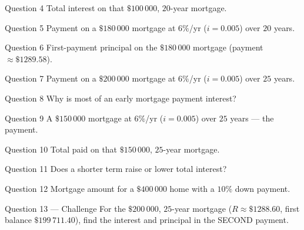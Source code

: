 \documentclass[11pt]{article}
\begin{document}
\begin{qbox}{Question 4}
Total interest on that $\$100\,000$, $20$-year mortgage.\workspace{2.4cm}
\end{qbox}

\begin{qbox}{Question 5}
Payment on a $\$180\,000$ mortgage at $6\%$/yr ($i=0.005$) over $20$ years.\workspace{2.4cm}
\end{qbox}

\begin{qbox}{Question 6}
First-payment principal on the $\$180\,000$ mortgage (payment $\approx\$1289.58$).\workspace{2.4cm}
\end{qbox}

\begin{qbox}{Question 7}
Payment on a $\$200\,000$ mortgage at $6\%$/yr ($i=0.005$) over $25$ years.\workspace{2.4cm}
\end{qbox}

\begin{qbox}{Question 8}
Why is most of an early mortgage payment interest?\workspace{2.4cm}
\end{qbox}

\begin{qbox}{Question 9}
A $\$150\,000$ mortgage at $6\%$/yr ($i=0.005$) over $25$ years — the payment.\workspace{2.4cm}
\end{qbox}

\begin{qbox}{Question 10}
Total paid on that $\$150\,000$, $25$-year mortgage.\workspace{2.4cm}
\end{qbox}

\begin{qbox}{Question 11}
Does a shorter term raise or lower total interest?\workspace{2.4cm}
\end{qbox}

\begin{qbox}{Question 12}
Mortgage amount for a $\$400\,000$ home with a $10\%$ down payment.\workspace{2.4cm}
\end{qbox}

\begin{qbox}{Question 13 --- Challenge}
For the $\$200\,000$, $25$-year mortgage ($R\approx\$1288.60$, first balance $\$199\,711.40$), find the interest and principal in the SECOND payment.\workspace{3.2cm}
\end{qbox}

\clearpage
{}
\end{document}
